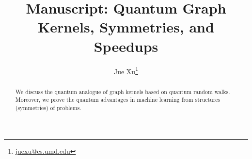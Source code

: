 \documentclass[11pt]{article}
\title{Manuscript: Quantum Graph Kernels, Symmetries, and Speedups}
\author{Jue Xu\footnote{\href{mailto:juexu@cs.umd.edu}{ juexu@cs.umd.edu}} }
\theoremstyle{plain}
\theoremstyle{definition}
\begin{document}
\maketitle
\begin{abstract}
	We discuss the quantum analogue of graph kernels based on quantum random walks. 
	Moreover, we prove the quantum advantages in machine learning from structures (symmetries) of problems.
\end{abstract}

\setcounter{tocdepth}{2}
\tableofcontents


% 
% 
% 
% 
% 
% 
% 
% 





% 
% 
% 
% 
\end{document}
